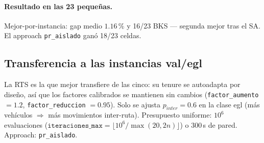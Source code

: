\paragraph{Resultado en las 23 pequeñas.} Mejor-por-instancia: gap medio
$1.16\,\%$ y 16/23 BKS --- segunda mejor tras el SA. El approach
\texttt{pr\_aislado} ganó 18/23 celdas.

\subsection{Transferencia a las instancias val/egl}
La RTS es la que mejor transfiere de las cinco: su tenure se autoadapta por
diseño, así que los factores calibrados se mantienen sin cambios
(\texttt{factor\_aumento} $= 1.2$, \texttt{factor\_reduccion} $= 0.95$). Solo
se ajusta $p_{inter} = 0.6$ en la clase egl (más vehículos $\Rightarrow$ más
movimientos inter-ruta). Presupuesto uniforme: $10^6$ evaluaciones
($\texttt{iteraciones\_max} = \lfloor 10^6 / \max(20, 2n) \rfloor$) o 300\,s
de pared. Approach: \texttt{pr\_aislado}.
